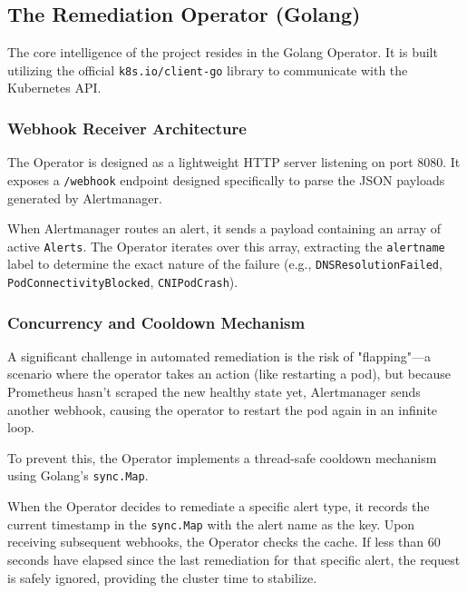 \documentclass[12pt,a4paper]{article}
\begin{document}
\subsection{The Remediation Operator (Golang)}
The core intelligence of the project resides in the Golang Operator. It is built utilizing the official \texttt{k8s.io/client-go} library to communicate with the Kubernetes API.

\subsubsection{Webhook Receiver Architecture}
The Operator is designed as a lightweight HTTP server listening on port 8080. It exposes a \texttt{/webhook} endpoint designed specifically to parse the JSON payloads generated by Alertmanager. 

When Alertmanager routes an alert, it sends a payload containing an array of active \texttt{Alerts}. The Operator iterates over this array, extracting the \texttt{alertname} label to determine the exact nature of the failure (e.g., \texttt{DNSResolutionFailed}, \texttt{PodConnectivityBlocked}, \texttt{CNIPodCrash}).

\subsubsection{Concurrency and Cooldown Mechanism}
A significant challenge in automated remediation is the risk of "flapping"—a scenario where the operator takes an action (like restarting a pod), but because Prometheus hasn't scraped the new healthy state yet, Alertmanager sends another webhook, causing the operator to restart the pod again in an infinite loop.

To prevent this, the Operator implements a thread-safe cooldown mechanism using Golang's \texttt{sync.Map}. 

When the Operator decides to remediate a specific alert type, it records the current timestamp in the \texttt{sync.Map} with the alert name as the key. Upon receiving subsequent webhooks, the Operator checks the cache. If less than 60 seconds have elapsed since the last remediation for that specific alert, the request is safely ignored, providing the cluster time to stabilize.
\end{document}
